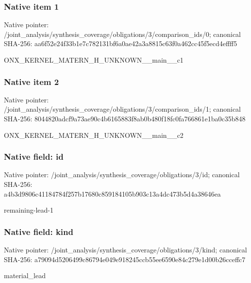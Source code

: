 \documentclass[10pt,a4paper]{article}
\begin{document}
\subsubsection{Native item 1}
Native pointer: /joint\_\allowbreak{}analysis/synthesis\_\allowbreak{}coverage/obligations/3/comparison\_\allowbreak{}ids/0; canonical SHA-256: aa6f52e24f33b1e7c782131bf6a0ae42a3a8815c63f0a462cc45f5ecd4effff5

\begingroup\raggedright\sloppy ONX\_\allowbreak{}KERNEL\_\allowbreak{}MATERN\_\allowbreak{}H\_\allowbreak{}UNKNOWN\_\allowbreak{}\_\allowbreak{}main\_\allowbreak{}\_\allowbreak{}c1\par\endgroup

\subsubsection{Native item 2}
Native pointer: /joint\_\allowbreak{}analysis/synthesis\_\allowbreak{}coverage/obligations/3/comparison\_\allowbreak{}ids/1; canonical SHA-256: 8044820adcf9a73ae90c4b6165883f8ab0b480f18fc0fa766861e1ba0c35b848

\begingroup\raggedright\sloppy ONX\_\allowbreak{}KERNEL\_\allowbreak{}MATERN\_\allowbreak{}H\_\allowbreak{}UNKNOWN\_\allowbreak{}\_\allowbreak{}main\_\allowbreak{}\_\allowbreak{}c2\par\endgroup

\subsubsection{Native field: id}
Native pointer: /joint\_\allowbreak{}analysis/synthesis\_\allowbreak{}coverage/obligations/3/id; canonical SHA-256: a4b3d9806c41184784f257b17680c859184105b903c13a4dc473b5d4a38646ea

\begingroup\raggedright\sloppy remaining-lead-1\par\endgroup

\subsubsection{Native field: kind}
Native pointer: /joint\_\allowbreak{}analysis/synthesis\_\allowbreak{}coverage/obligations/3/kind; canonical SHA-256: a79094d5206499c86794e049e918245ccb55ee6590e84c279e1d00b26cceffc7

\begingroup\raggedright\sloppy material\_\allowbreak{}lead\par\endgroup
\end{document}
